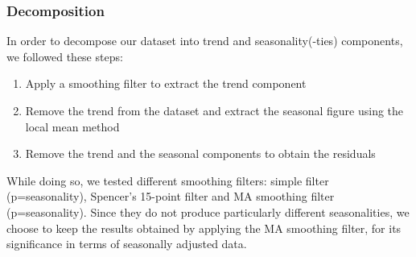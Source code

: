 \documentclass[12pt]{article}
\begin{document}
\subsubsection{Decomposition}
In order to decompose our dataset into trend and seasonality(-ties) components, we followed these steps:
\begin{enumerate}[topsep=0.5em,itemsep=0em,partopsep=0.5em]
	\item Apply a smoothing filter to extract the trend component
	\item Remove the trend from the dataset and extract the seasonal figure using the local mean method
	\item Remove the trend and the seasonal components to obtain the residuals
\end{enumerate}
While doing so, we tested different smoothing filters: simple filter (p=seasonality), Spencer's 15-point filter and MA smoothing filter (p=seasonality). Since they do not produce particularly different seasonalities, we choose to keep the results obtained by applying the MA smoothing filter, for its significance in terms of seasonally adjusted data.
\end{document}

